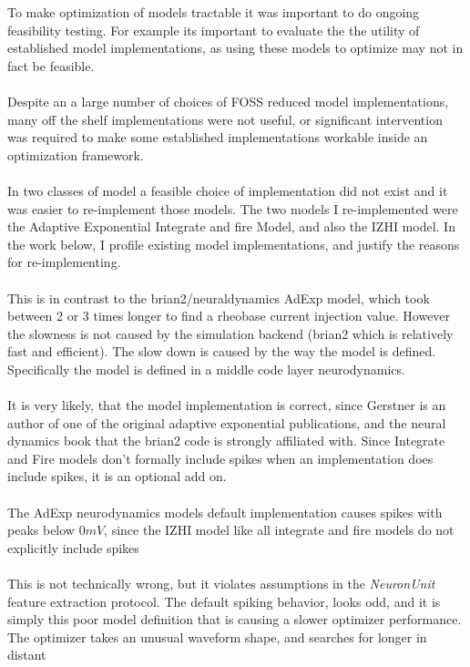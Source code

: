 To make optimization of models tractable it was important to do ongoing feasibility testing. For example its important to evaluate the the utility of established model implementations, as using these models to optimize may not in fact be feasible.\\ 
\\
Despite an a large number of choices of FOSS reduced model
implementations, many off the shelf implementations were not useful, or significant intervention was required to make some established implementations workable inside an optimization framework. \\
\\
In two classes of model a feasible choice of implementation did not exist and it was easier to re-implement those models. The two models I re-implemented were
the Adaptive Exponential Integrate and fire Model, and also the IZHI
model.  In the work below, I profile existing model implementations, and
justify the reasons for re-implementing.\\
\\
This is in contrast to the brian2/neuraldynamics AdExp model, which took
between 2 or 3 times longer to find a rheobase current injection value. However the slowness is not caused by the simulation backend (brian2 which is relatively fast and efficient). The slow down is caused by the way the model is defined. Specifically the
model is defined in a middle code layer neurodynamics\cite{gerstner2014neuronal}.\\
\\
It is very likely, that the model implementation is correct, since Gerstner is an author of one of the original adaptive exponential publications, and the neural dynamics book that the brian2 code is strongly affiliated with. Since Integrate and Fire models don't formally include spikes when an implementation does include spikes, it is an optional add on.\\
\\
The AdExp neurodynamics models default implementation causes spikes with peaks below $0mV$, since the IZHI model like all integrate and fire models do not explicitly include spikes\\
\\
This is not technically wrong, but it violates
assumptions in the \emph{NeuronUnit} feature extraction protocol. The default spiking behavior, looks odd, and it is simply this poor model definition that is causing a slower optimizer performance. The optimizer takes an unusual waveform shape, and searches for longer in distant

